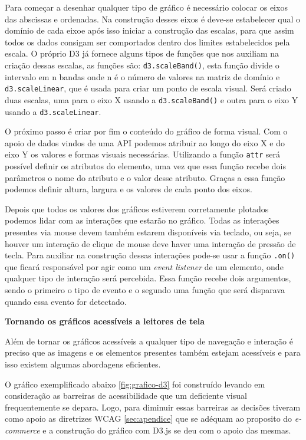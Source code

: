 {Para começar a desenhar qualquer tipo de gráfico é necessário colocar os eixos das abscissas e ordenadas. Na construção desses eixos é deve-se estabelecer qual o domínio de cada  eixoe após isso iniciar a construção das escalas, para que assim todos os dados consigam ser comportados dentro dos limites estabelecidos pela escala. O próprio D3 \cite{D3} já fornece alguns tipos de funções que nos auxiliam na criação dessas escalas, as funções são: \lstinline{d3.scaleBand()}, esta função divide o intervalo em n bandas onde n é o número de valores na matriz de domínio e \lstinline{d3.scaleLinear}, que é usada para criar um ponto de escala visual. Será criado duas escalas, uma para o eixo X usando a \lstinline{d3.scaleBand()} e outra para o eixo Y usando a \lstinline{d3.scaleLinear}.

O próximo passo é criar por fim o conteúdo do gráfico de forma visual. Com o apoio de dados vindos de uma API podemos atribuir ao longo do eixo X e do eixo Y os valores e formas visuais necessárias. Utilizando a função \lstinline{attr} será possível definir os atributos do elemento, uma vez que essa função recebe dois parâmetros o nome do atributo e o valor desse atributo. Graças a essa função podemos definir altura, largura e os valores de cada ponto dos eixos.

Depois que todos os valores dos gráficos estiverem corretamente plotados podemos lidar com as interações que estarão no gráfico. Todas as interações presentes via mouse devem também estarem disponíveis via teclado, ou seja, se houver um interação de clique de mouse deve haver uma interação de pressão de tecla. Para auxiliar na construção dessas interações pode-se usar a função \lstinline{.on()} que ficará responsável por agir como um \textit{event listener} de um elemento, onde qualquer tipo de interação será percebida. Essa função recebe dois argumentos, sendo o primeiro o tipo de evento e o segundo uma função que será disparava quando essa evento for detectado. 


\vspace{1cm}
{\centerline{\textbf{Tornando os gráficos acessíveis a leitores de tela}}}
{Além de tornar os gráficos acessíveis a qualquer tipo de navegação e interação é preciso que as imagens e os elementos presentes também estejam acessíveis e para isso existem algumas abordagens eficientes.  

O gráfico exemplificado abaixo \ref{fig:grafico-d3} foi construído levando em consideração as barreiras de acessibilidade que um deficiente visual frequentemente se depara. Logo, para diminuir essas barreiras as decisões tiveram como apoio as diretrizes WCAG \ref{sec:apendice} que se adéquam ao proposito do \textit{e-commerce} e a construção do gráfico com D3.js \cite{D3} se deu com o apoio das mesmas. 


}}
